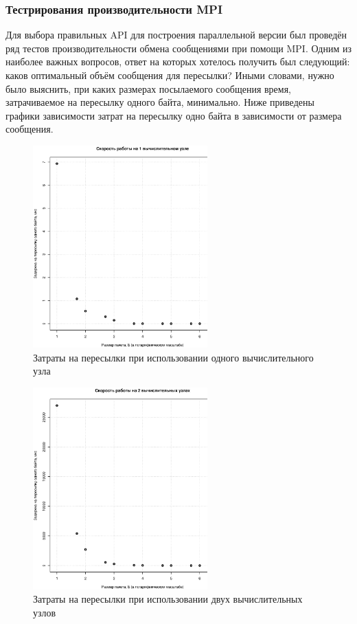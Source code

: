 \subsubsection{Тестрирования производительности MPI}
Для выбора правильных API для построения параллельной версии был проведён ряд тестов производительности обмена сообщениями при помощи MPI. Одним из наиболее важных вопросов, ответ на которых хотелось получить был следующий: каков оптимальный объём сообщения для пересылки? Иными словами, нужно было выяснить, при каких размерах посылаемого сообщения время, затрачиваемое на пересылку одного байта, минимально.
Ниже приведены графики зависимости затрат на пересылку одно байта в зависимости от размера сообщения.
\begin{figure}[htp]
\centering
\includegraphics[width=0.6\textwidth]{eps/mpi-1host.eps}
\caption{Затраты на пересылки при использовании одного вычислительного
 узла}
\label{pic:mpi1host}
\end{figure}
\begin{figure}[htp]
\centering
\includegraphics[width=0.6\textwidth]{eps/mpi-2hosts.eps}
\caption{Затраты на пересылки при использовании двух вычислительных узлов}
\label{pic:mpi2hosts}
\end{figure}
